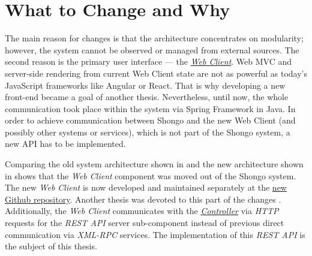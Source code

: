 \section{What to Change and Why}

The main reason for changes is that the architecture concentrates on modularity; however, the system cannot be observed or managed from external sources.
The second reason is the primary user interface --- the \hyperref[webclient]{\emph{Web Client}}. Web MVC and server-side rendering from current Web Client state are not as powerful as today's JavaScript frameworks like Angular or React.
That is why developing a new front-end became a goal of another thesis. \cite{drobnakm}
Nevertheless, until now, the whole communication took place within the system via Spring Framework in Java. In order to achieve communication between Shongo and the new Web Client (and possibly other systems or services), which is not part of the Shongo system, a new API has to be implemented.


Comparing the old system architecture shown in  and the new architecture shown in  shows that the \emph{Web Client} component was moved out of the Shongo system. The new \emph{Web Client} is now developed and maintained separately at the \href{https://github.com/shongo/shongo-frontend}{new Github repository}. Another thesis was devoted to this part of the changes \cite{drobnakm}.
Additionally, the \emph{Web Client} communicates with the \hyperref[controller]{\emph{Controller}} via \emph{HTTP} requests for the \emph{REST API} server sub-component instead of previous direct communication via \emph{XML-RPC} services. The implementation of this \emph{REST API} is the subject of this thesis.
